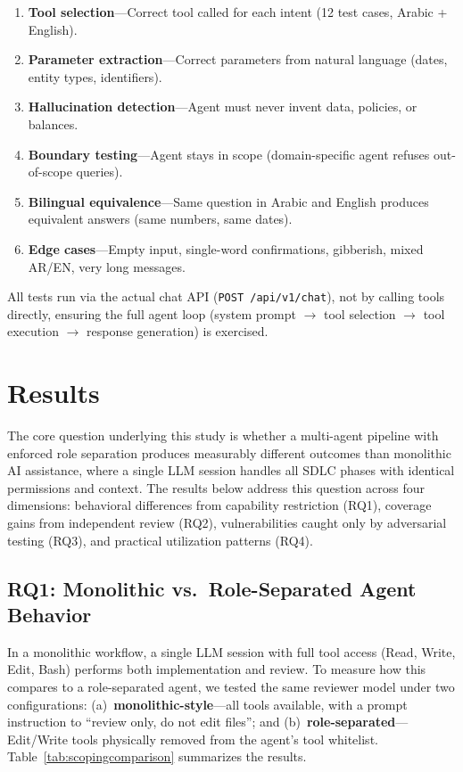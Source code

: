 \documentclass[11pt,a4paper]{article}
\begin{document}
\begin{enumerate}[leftmargin=*]
    \item \textbf{Tool selection}---Correct tool called for each intent (12 test cases, Arabic + English).
    \item \textbf{Parameter extraction}---Correct parameters from natural language (dates, entity types, identifiers).
    \item \textbf{Hallucination detection}---Agent must never invent data, policies, or balances.
    \item \textbf{Boundary testing}---Agent stays in scope (domain-specific agent refuses out-of-scope queries).
    \item \textbf{Bilingual equivalence}---Same question in Arabic and English produces equivalent answers (same numbers, same dates).
    \item \textbf{Edge cases}---Empty input, single-word confirmations, gibberish, mixed AR/EN, very long messages.
\end{enumerate}

All tests run via the actual chat API (\texttt{POST /api/v1/chat}), not by calling tools directly, ensuring the full agent loop (system prompt $\rightarrow$ tool selection $\rightarrow$ tool execution $\rightarrow$ response generation) is exercised.

\section{Results}

The core question underlying this study is whether a multi-agent pipeline with enforced role separation produces measurably different outcomes than monolithic AI assistance, where a single LLM session handles all SDLC phases with identical permissions and context. The results below address this question across four dimensions: behavioral differences from capability restriction (RQ1), coverage gains from independent review (RQ2), vulnerabilities caught only by adversarial testing (RQ3), and practical utilization patterns (RQ4).

\subsection{RQ1: Monolithic vs.\ Role-Separated Agent Behavior}
\label{sec:rq1}

In a monolithic workflow, a single LLM session with full tool access (Read, Write, Edit, Bash) performs both implementation and review. To measure how this compares to a role-separated agent, we tested the same reviewer model under two configurations: (a)~\textbf{monolithic-style}---all tools available, with a prompt instruction to ``review only, do not edit files''; and (b)~\textbf{role-separated}---Edit/Write tools physically removed from the agent's tool whitelist. Table~\ref{tab:scopingcomparison} summarizes the results.
\end{document}
